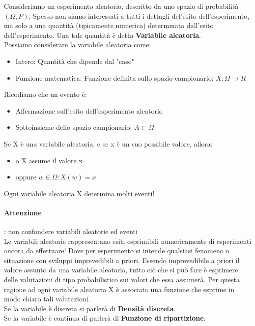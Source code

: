 \documentclass[12pt, a4paper, openany]{book}
\begin{document}
Consideriamo un esperimento aleatorio, descritto da uno spazio di probabilità $(\Omega, P)$.
Spesso non siamo interessati a tutti i dettagli del'esito dell'esperimento, ma solo a 
una quantità (tipicamente numerica) determinata dall'esito dell'esperimento.
Una tale quantità è detta \textbf{Variabile aleatoria}.
\\ Possiamo considerare la variabile aleatoria come:
\begin{itemize}
    \item Intero: Quantità che dipende dal "caso"
    \item Funzione matematica: Funzione definita sullo spazio campionario: $X: \Omega \to R$
\end{itemize}
Ricodiamo che un evento è:
\begin{itemize}
    \item Affermazione sull'esito dell'esperimento aleatorio
    \item Sottoinsieme dello spazio campionario: $A \subset \Omega$
\end{itemize}

Se X è una variabile aleatoria, e se x è un suo possibile valore, allora:
\begin{itemize}
    \item o X assume il valore x
    \item oppure ${w \in \Omega: X(w) = x }$
\end{itemize}

Ogni variabile aleatoria X determina molti eventi!
\paragraph{Attenzione}: non confondere variabili aleatorie ed eventi
\\ Le variabili aleatorie rappresentano esiti esprimibili numericamente di esperimenti
ancora da effettuare! Dove per esperimento si intende qualsiasi fenomeno o situazione con sviluppi
imprevedibili a priori. Essendo imprevedibile a priori il valore assunto da una variabile
aleatoria, tutto ciò che si può fare è esprimere delle valutazioni di tipo probabilistico sui valori
che essa assumerà. Per questa ragione ad ogni variabile aleatoria X è associata una funzione che esprime
in modo chiaro tali valutazioni. 
\\Se la variabile è discreta si parlerà di \textbf{Densità discreta}.
\\Se la variabile è continua di parlerà di \textbf{Funzione di ripartizione}.
\end{document}
